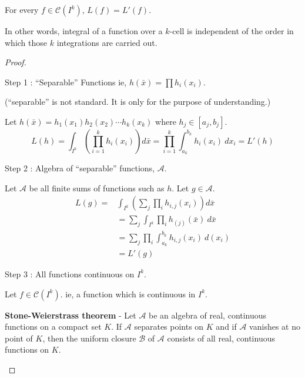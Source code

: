 \begin{theorem}
	For every $f \in \mathscr{C}(I^k)$, $L(f) = L'(f)$.

\begin{commentary}
	In other words, integral of a function over a $k$-cell is independent of the order in which those $k$ integrations are carried out.
\end{commentary}
\end{theorem}
\begin{proof}
\begin{commentary}Step 1 : ``Separable'' Functions ie, $h(\bar{x}) = \prod h_i(x_i)$.\end{commentary}

\begin{commentary}
	(``separable'' is not standard.
	It is only for the purpose of understanding.)
\end{commentary}

Let $h(\bar{x}) = h_1(x_1)h_2(x_2)\cdots h_k(x_k)$ where $h_j \in [a_j,b_j]$.
	\[ L(h) = \int_{I^k} \left(\prod_{i = 1}^k h_i(x_i)\right) d\bar{x} = \prod_{i = 1}^k \int_{a_k}^{b_k} h_i(x_i)\ dx_i = L'(h) \]
\begin{commentary}Step 2 : Algebra of ``separable'' functions, $\mathscr{A}$.\end{commentary}

Let $\mathscr{A}$ be all finite sums of functions such as $h$.
Let $g \in \mathscr{A}$.
\begin{align*}
	L(g) = & \int_{I^k} \left(\sum_j \prod_i h_{i,j}(x_i) \right) d\bar{x} \\
	& = \sum_j \int_{I^k} \prod_i h_{(j)}(\bar{x})\ d\bar{x}\\
	& = \sum_j \prod_i \int_{a_k}^{b_k} h_{i,j}(x_i)\ d(x_i)\\
	& = L'(g)
\end{align*}
\begin{commentary}Step 3 : All functions continuous on $I^k$.\end{commentary}

Let $f \in \mathscr{C}(I^k)$.
ie, a function which is continuous in $I^k$.

\begin{commentary}
	\textbf{Stone-Weierstrass theorem} - Let $\mathscr{A}$ be an algebra of real, continuous functions on a compact set $K$.
	If $\mathscr{A}$ separates points on $K$ and if $\mathscr{A}$ vanishes at no point of $K$, then the uniform closure $\mathscr{B}$ of $\mathscr{A}$ consists of all real, continuous functions on $K$.


\end{commentary}
\end{proof}
